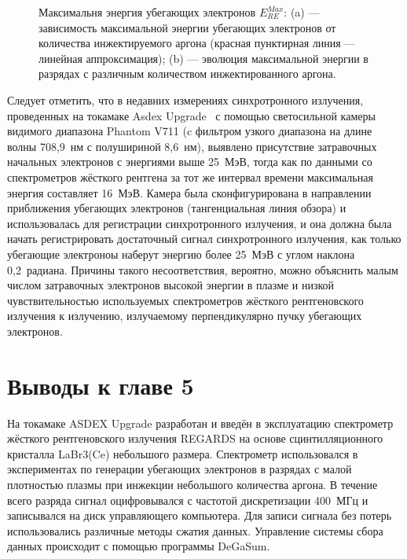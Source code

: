 \begin{figure}[ht!]
  \caption{ Максимальня энергия убегающих электронов $ E_{RE}^{Max}$: (a) --- зависимость максимальной энергии убегающих электронов от количества инжектируемого аргона (красная пунктирная линия --- линейная аппроксимация); (b) --- эволюция максимальной энергии в разрядах с различным количеством инжектированного аргона.~\cite{Shevelev2021} }
  \label{fig:asdexMaxElectronEnergy}
\end{figure}

Следует отметить, что в недавних измерениях синхротронного излучения, проведенных на токамаке Asdex Upgrade~\cite{PazSoldan2017} с помощью светосильной камеры видимого диапазона Phantom V711 (c фильтром узкого диапазона на длине волны 708,9~нм с полушириной 8,6~нм), выявлено присутствие затравочных начальных электронов с энергиями выше 25~МэВ, тогда как по данными со спектрометров жёсткого рентгена за тот же интервал времени  максимальная энергия составляет 16~МэВ. Камера была сконфигурирована в направлении приближения убегающих электронов (тангенциальная линия обзора) и использовалась для регистрации синхротронного излучения, и она должна была начать регистрировать достаточный сигнал синхротронного излучения, как только убегающие электроноы наберут энергию более 25~МэВ с углом наклона 0,2~радиана. Причины такого несоответствия, вероятно, можно объяснить малым числом затравочных электронов высокой энергии в плазме и низкой чувствительностью используемых спектрометров жёсткого рентгеновского излучения к излучению, излучаемому перпендикулярно пучку убегающих электронов.~\cite{Shevelev2021}


\section{Выводы к главе 5}

На токамаке ASDEX Upgrade разработан и введён в эксплуатацию спектрометр жёсткого рентгеновского излучения REGARDS на основе сцинтилляционного кристалла LaBr3(Ce) небольшого размера. Спектрометр использовался в экспериментах по генерации убегающих электронов в разрядах с малой плотностью плазмы при инжекции небольшого количества аргона. В течение всего разряда сигнал оцифровывался с частотой дискретизации 400~МГц и записывался на диск управляющего компьютера. Для записи сигнала без потерь использовались различные методы сжатия данных. Управление системы сбора данных происходит с помощью программы DeGaSum.

